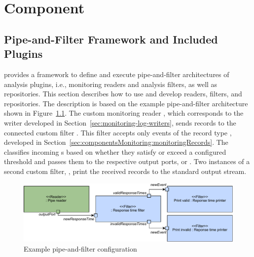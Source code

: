 % 

\chapter{\KiekerAnalysisPart{} Component}\label{chap:componentsAnalysis}


\section{Pipe-and-Filter Framework and Included Plugins}\label{sec:analysis:controller}

\KiekerAnalysisPart{} provides a framework to define and execute pipe-and-filter %
architectures of analysis plugins, i.e., monitoring readers and analysis filters, %
as well as repositories. %
This section describes how to use and develop readers, filters, and %
repositories. The description is based on the example %
pipe-and-filter architecture shown in Figure~\ref{fig:example:pipe-and-filter}. The custom monitoring reader %
, which corresponds to the writer developed in Section~\ref{sec:monitoring-log-writers}, %
sends records to the connected custom filter . %
This filter accepts only events of the record type , 
developed in Section~\ref{sec:componentsMonitoring:monitoringRecords}. %
The  classifies incoming s %
based on whether they satisfy or exceed a configured threshold and passes them %
to the respective output ports,  or . %
Two instances of a second custom filter, , %
print the received records to the standard output stream. 

\begin{figure}
\includegraphics[width=\textwidth]{images/example-pipe-and-filter}
\caption{Example pipe-and-filter configuration}
\label{fig:example:pipe-and-filter}
\end{figure}

